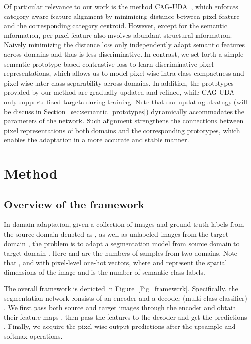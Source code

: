 \documentclass[runningheads]{llncs}
\begin{document}
Of particular relevance to our work is the method CAG-UDA~\cite{zhang2019category}, which enforces category-aware feature alignment by minimizing distance between pixel feature and the corresponding category centroid. 
However, except for the semantic information, per-pixel feature also involves abundant structural information. Naively minimizing the distance loss only independently adapt semantic features across domains and thus is less discriminative. 
In contrast, we set forth a simple semantic prototype-based contrastive loss to learn discriminative pixel representations, which allows us to model pixel-wise intra-class compactness and pixel-wise inter-class separability across domains. 
In addition, the prototypes provided by our method are gradually updated and refined, while CAG-UDA only supports fixed targets during training. Note that our updating strategy (will be discuss in Section~\ref{sec:semantic_prototypes}) dynamically accommodates the parameters of the network.
Such alignment strengthens the connections between pixel representations of both domains and the corresponding prototypes, which enables the adaptation in a more accurate and stable manner.



\section{Method}\label{sec:method}

\subsection{Overview of the framework}
In domain adaptation, given a collection of images and ground-truth labels from the source domain denoted as , as well as unlabeled images from the target domain , the problem is to adapt a segmentation model from source domain  to target domain . Here  and  are the numbers of samples from two domains. Note that , and  with pixel-level one-hot vectors, where  and  represent the spatial dimensions of the image and  is the number of semantic class labels. 

The overall framework is depicted in Figure~\ref{Fig_framework}.
Specifically, the segmentation network consists of an encoder  and a decoder (multi-class classifier) . 
We first pass both source and target images through the encoder  and obtain their feature maps , then pass the features to the decoder  and get the predictions . Finally, we acquire the pixel-wise output predictions  after the upsample and softmax operations. 
\end{document}
